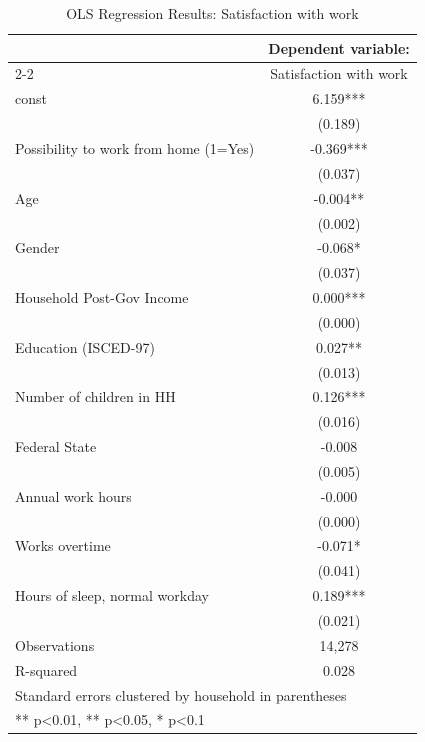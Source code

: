 \begin{table}[htbp]
\centering
\caption{OLS Regression Results: Satisfaction with work}
\label{tab:ols_results}
\begin{tabular}{lc}
\toprule
 & Dependent variable: \\ \cline{2-2}
 & Satisfaction with work \\
\midrule
const & 6.159*** \\
 & (0.189) \\
\addlinespace
Possibility to work from home (1=Yes) & -0.369*** \\
 & (0.037) \\
\addlinespace
Age & -0.004** \\
 & (0.002) \\
\addlinespace
Gender & -0.068* \\
 & (0.037) \\
\addlinespace
Household Post-Gov Income & 0.000*** \\
 & (0.000) \\
\addlinespace
Education (ISCED-97) & 0.027** \\
 & (0.013) \\
\addlinespace
Number of children in HH & 0.126*** \\
 & (0.016) \\
\addlinespace
Federal State & -0.008 \\
 & (0.005) \\
\addlinespace
Annual work hours & -0.000 \\
 & (0.000) \\
\addlinespace
Works overtime & -0.071* \\
 & (0.041) \\
\addlinespace
Hours of sleep, normal workday & 0.189*** \\
 & (0.021) \\
\addlinespace
\midrule
Observations & 14,278 \\
R-squared & 0.028 \\
\bottomrule
\multicolumn{2}{l}{\small Standard errors clustered by household in parentheses} \\
\multicolumn{2}{l}{\small *** p<0.01, ** p<0.05, * p<0.1}
\end{tabular}
\end{table}